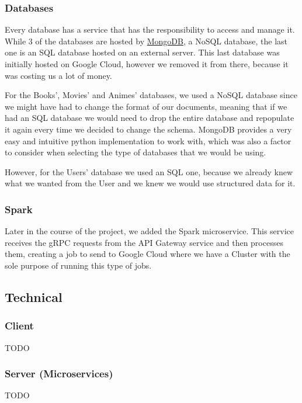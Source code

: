 \documentclass[oneside]{article}
\newcommand*\fpar{\hspace{1ex}}
\begin{document}
    \subsubsection{Databases}
    \fpar Every database has a service that has the responsibility to access and manage it. While 3 of the databases are hosted by \href{https://www.mongodb.com/}{MongoDB}, a NoSQL database, the last one is an SQL database hosted on an external server. This last database was initially hosted on Google Cloud, however we removed it from there, because it was costing us a lot of money.
    \par For the Books', Movies' and Animes' databases, we used a NoSQL database since we might have had to change the format of our documents, meaning that if we had an SQL database we would need to drop the entire database and repopulate it again every time we decided to change the schema. MongoDB provides a very easy and intuitive python implementation to work with, which was also a factor to consider when selecting the type of databases that we would be using.
    \par However, for the Users' database we used an SQL one, because we already knew what we wanted from the User and we knew we would use structured data for it.

    \subsubsection{Spark}
    \fpar Later in the course of the project, we added the Spark microservice. This service receives the gRPC requests from the API Gateway service and then processes them, creating a job to send to Google Cloud where we have a Cluster with the sole purpose of running this type of jobs.

  \subsection{Technical}
    \subsubsection{Client}
    \fpar TODO

    \subsubsection{Server (Microservices)}
    \fpar TODO
\end{document}
